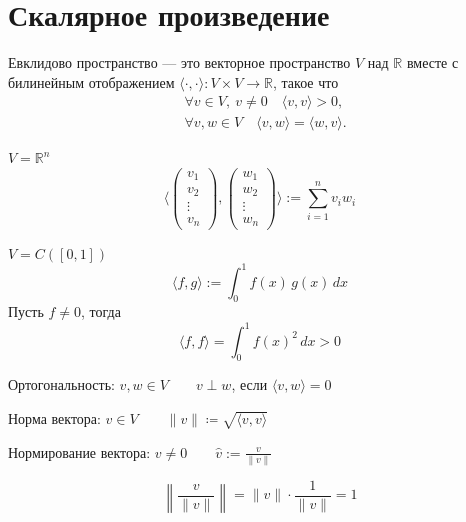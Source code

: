 \section{Скалярное произведение}

\begin{definition}
    Евклидово пространство --- это векторное пространство $V$ над $\mathbb{R}$
    вместе с билинейным отображением $\langle\cdot,\cdot\rangle \colon V \times V  \to \mathbb{R}$,
    такое что
    \[
    \begin{aligned}
        &\forall v \in V, \ v \ne 0 \quad \langle v,v\rangle > 0, \\
        &\forall v, w \in V \quad \langle v, w\rangle = \langle w, v\rangle.
    \end{aligned}
    \]
\end{definition}

\begin{examplelist}
        \item $V = \mathbb{R}^n$
            \[
            \langle
            \begin{pmatrix} v_1 \\ v_2 \\ \vdots \\ v_n \end{pmatrix},
            \begin{pmatrix} w_1 \\ w_2 \\ \vdots \\ w_n \end{pmatrix}
            \rangle
            := \sum_{i=1}^{n} v_i w_i
            \]
        \item $V = C([0,1])$
            \[
            \langle f, g\rangle := \int_0^1 f(x)\, g(x)\, dx
            \]
            Пусть $f \neq 0$, тогда
            \[
            \langle f, f\rangle = \int_0^1 f(x)^2\, dx > 0
            \]
\end{examplelist}


\begin{definition}
    Ортогональность:
    $v, w \in V \qquad v \perp w$, если $\langle v,w\rangle = 0$
\end{definition}

\begin{definition}
    Норма вектора:
    $v \in V \qquad \lVert v \rVert \coloneqq \sqrt{\langle v, v \rangle}$
\end{definition}

\begin{definition}
    Нормирование вектора:
    $v \neq 0 \qquad \hat{v} := \frac{v}{\|v\|}$

    \[
        \left\lVert \frac{v}{\|v\|} \right\rVert
        = \|v\| \cdot
        \frac{1}{\|v\|} = 1
    \]
\end{definition}



